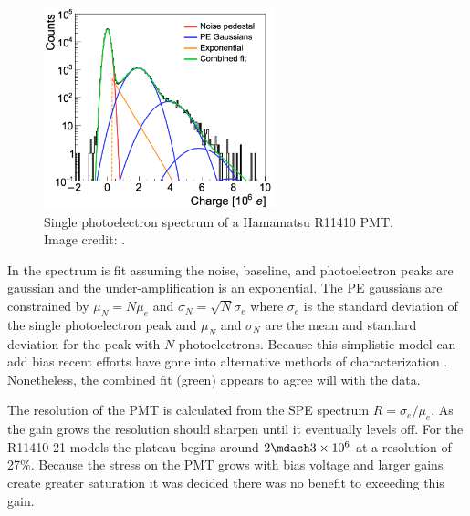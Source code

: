 \begin{figure}
\centering
\includegraphics[width=0.6\textwidth]{SPESpectrum}
\caption{Single photoelectron spectrum of a Hamamatsu R11410 PMT.  Image credit: .}
\label{fig:xenon1t_pmt_spe}
\end{figure}

In  the spectrum is fit assuming the noise, baseline, and photoelectron peaks are gaussian and the
under-amplification is
an exponential.  The PE gaussians are constrained by $\mu_{N} = N \mu_{e}$ and $\sigma_{N} = \sqrt{N} \sigma_{e}$ where $\sigma_{e}$ is the
standard deviation of the single photoelectron peak and $\mu_{N}$ and $\sigma_{N}$ are the mean and standard deviation for the peak with
$N$ photoelectrons.  Because this simplistic model can add bias recent efforts have gone into alternative methods
of characterization .  Nonetheless, the combined fit (green) appears to agree will with the data.

The resolution of the PMT is calculated from the SPE spectrum $R = \sigma_{e} / \mu_{e}$.  As the gain grows the resolution should sharpen
until it eventually levels off.  For the R11410-21 models the plateau begins around $2 \mdash 3 \times 10^{6}$ at a resolution of
27\%.  Because the stress on the PMT grows with bias voltage and larger gains create greater saturation it was decided there was no
benefit to exceeding this gain.

